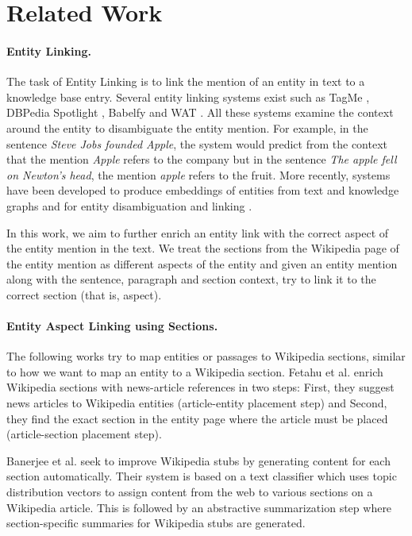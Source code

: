 \section{Related Work}
\label{sec:Related Work}

\paragraph{\textbf{Entity Linking.}}
The task of Entity Linking is to link the mention of an entity in text to a knowledge base entry. Several entity linking systems exist such as TagMe \cite{ferragina2010tagme}, DBPedia Spotlight \cite{mendes2011dbpedia}, Babelfy \cite{babelfy} and WAT \cite{piccinno2014wat}. All these systems examine the context around the entity to disambiguate the entity mention. 
For example, in the sentence \textit{Steve Jobs founded Apple}, the system would predict from the context that the mention \textit{Apple} refers to the company but in the sentence \textit{The apple fell on Newton's head}, the mention \textit{apple} refers to the fruit. 
More recently, systems have been developed to produce embeddings of entities from text and knowledge graphs \cite{huang2015leveraging,ristoski2016rdf2vec,yamada2016joint} and for entity disambiguation and linking \cite{yamada2017learning}. 

In this work, we aim to further enrich an entity link with the correct aspect of the entity mention in the text. We treat the sections from the Wikipedia page of the entity mention as different aspects of the entity and given an entity mention along with the sentence, paragraph and section context, try to link it to the correct section (that is, aspect).

\paragraph{\textbf{Entity Aspect Linking using Sections.}} 
The following works try to map entities or passages to Wikipedia sections, similar to how we want to map an entity to a Wikipedia section.
Fetahu et al. \cite{fetahu2015automated} enrich Wikipedia sections with news-article references in two steps: First, they suggest news articles to Wikipedia entities (article-entity placement step) and Second, they find the exact section in the entity page where the article must be placed (article-section placement step).

Banerjee et al. \cite{banerjee2015wikikreator} seek to improve Wikipedia stubs by generating content for each section automatically. Their system is based on a text classifier which uses topic distribution vectors to assign content from the web to various sections on a Wikipedia article. This is followed by an abstractive summarization step where section-specific summaries for Wikipedia stubs are generated.

